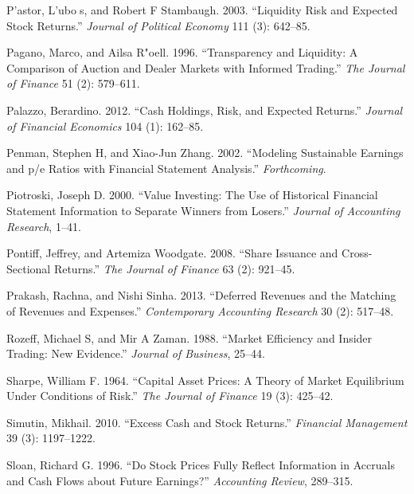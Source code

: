 \documentclass[
  letterpaper,
  DIV=11,
  numbers=noendperiod]{scrreprt}
\newlength{\cslhangindent}
\newlength{\cslentryspacingunit} %
\newenvironment{CSLReferences}[2] %
 {%
  \setlength{\parindent}{0pt}
  \ifodd #1
  \let\oldpar\par
  \def\par{\hangindent=\cslhangindent\oldpar}
  \fi
  \setlength{\parskip}{#2\cslentryspacingunit}
 }%
 {}
\begin{document}
\begin{CSLReferences}{1}{0}
\leavevmode{}%
P'astor, L'ubos, and Robert F Stambaugh. 2003. {``Liquidity Risk and
Expected Stock Returns.''} \emph{Journal of Political Economy} 111 (3):
642--85.

\leavevmode{}%
Pagano, Marco, and Ailsa R"oell. 1996. {``Transparency and Liquidity: A
Comparison of Auction and Dealer Markets with Informed Trading.''}
\emph{The Journal of Finance} 51 (2): 579--611.

\leavevmode{}%
Palazzo, Berardino. 2012. {``Cash Holdings, Risk, and Expected
Returns.''} \emph{Journal of Financial Economics} 104 (1): 162--85.

\leavevmode{}%
Penman, Stephen H, and Xiao-Jun Zhang. 2002. {``Modeling Sustainable
Earnings and p/e Ratios with Financial Statement Analysis.''}
\emph{Forthcoming}.

\leavevmode{}%
Piotroski, Joseph D. 2000. {``Value Investing: The Use of Historical
Financial Statement Information to Separate Winners from Losers.''}
\emph{Journal of Accounting Research}, 1--41.

\leavevmode{}%
Pontiff, Jeffrey, and Artemiza Woodgate. 2008. {``Share Issuance and
Cross-Sectional Returns.''} \emph{The Journal of Finance} 63 (2):
921--45.

\leavevmode{}%
Prakash, Rachna, and Nishi Sinha. 2013. {``Deferred Revenues and the
Matching of Revenues and Expenses.''} \emph{Contemporary Accounting
Research} 30 (2): 517--48.

\leavevmode{}%
Rozeff, Michael S, and Mir A Zaman. 1988. {``Market Efficiency and
Insider Trading: New Evidence.''} \emph{Journal of Business}, 25--44.

\leavevmode{}%
Sharpe, William F. 1964. {``Capital Asset Prices: A Theory of Market
Equilibrium Under Conditions of Risk.''} \emph{The Journal of Finance}
19 (3): 425--42.

\leavevmode{}%
Simutin, Mikhail. 2010. {``Excess Cash and Stock Returns.''}
\emph{Financial Management} 39 (3): 1197--1222.

\leavevmode{}%
Sloan, Richard G. 1996. {``Do Stock Prices Fully Reflect Information in
Accruals and Cash Flows about Future Earnings?''} \emph{Accounting
Review}, 289--315.


\end{CSLReferences}
\end{document}
